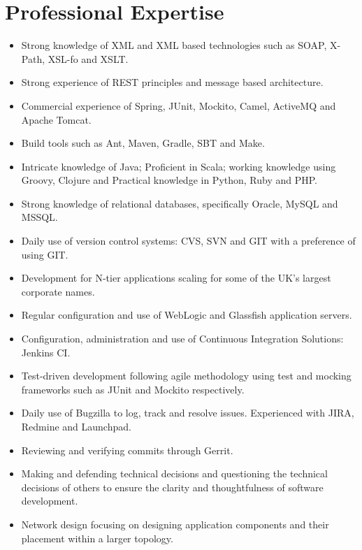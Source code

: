 \documentclass[a4paper,10pt]{moderncv}
\begin{document}
\section{Professional Expertise}
\begin{itemize}
\item Strong knowledge of XML and XML based technologies such as SOAP, X-Path, XSL-fo and XSLT.
\item Strong experience of REST principles and message based architecture.
\item Commercial experience of Spring, JUnit, Mockito, Camel, ActiveMQ and Apache Tomcat.
\item Build tools such as Ant, Maven, Gradle, SBT and Make.
\item Intricate knowledge of Java; Proficient in Scala; working knowledge using Groovy, Clojure and Practical knowledge in Python, Ruby and PHP.
\item Strong knowledge of relational databases, specifically Oracle, MySQL and MSSQL.
\item Daily use of version control systems: CVS, SVN and GIT with a preference of using GIT.
\item Development for N-tier applications scaling for some of the UK's largest corporate names.
\item Regular configuration and use of WebLogic and Glassfish application servers.
\item Configuration, administration and use of Continuous Integration
Solutions: Jenkins CI.
\item Test-driven development following agile methodology using test and mocking frameworks such as JUnit and Mockito respectively.
\item Daily use of Bugzilla to log, track and resolve issues. Experienced with JIRA, Redmine and Launchpad.
\item Reviewing and verifying commits through Gerrit.
\item Making and defending technical decisions and questioning the technical decisions of others to ensure the clarity and thoughtfulness of software development.
\item Network design focusing on designing application components and their placement within a larger topology.
\end{itemize}
\end{document}
